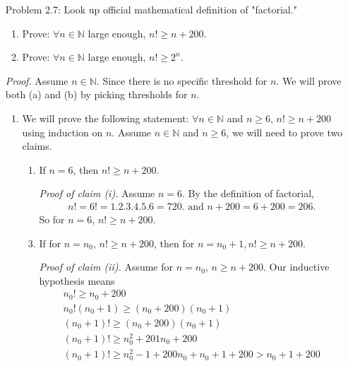 \documentclass{article}
\begin{document}
\begin{enumerate}
    \item[Problem 2.7:] Look up official mathematical definition of "factorial."
        \begin{enumerate}
            \item Prove: $\forall n \in \mathbb{N}$ large enough, $n! \ge n + 200$.
            \item Prove: $\forall n \in \mathbb{N}$ large enough, $n! \ge 2^n$.
        \end{enumerate}
    \item[] \emph{Proof.} Assume $n \in \mathbb{N}$. Since there is no specific threshold for $n$. We will prove both (a) and (b) by picking thresholds for $n$.
        \begin{enumerate}
            \item We will prove the following statement: $\forall n \in \mathbb{N}$ and $n \ge 6$, $n! \ge n + 200$ using induction on $n$. Assume $n \in \mathbb{N}$ and $n \ge 6$, we will need to prove two claims.
                \begin{enumerate}
                    \item If $n = 6$, then $n! \ge n + 200$.
                    \item[] \emph{Proof of claim (i).}  Assume $n = 6$. By the definition of factorial,
                        \begin{gather*}
                            n! = 6! = 1.2.3.4.5.6 = 720. \text{ and }
                            n + 200 = 6 + 200 = 206.
                        \end{gather*}
                        So for $n = 6$, $n! \ge n + 200$.
                    \item If for $n = n_0$, $n! \ge n + 200$, then for $n = n_0 + 1, n! \ge n + 200$.
                    \item[] \emph{Proof of claim (ii).} Assume for $n = n_0$, $n \ge n + 200$. Our inductive hypothesis means
                        \begin{gather*}
                            n_0! \ge n_0 + 200\\
                            n_0!(n_0 + 1) \ge (n_0 + 200)(n_0 + 1)\\
                            (n_0 + 1)! \ge (n_0 + 200)(n_0 + 1)\\
                            (n_0 + 1)! \ge n_0^2 + 201n_0 + 200\\
                            (n_0 + 1)! \ge n_0^2 - 1 + 200n_0 + n_0 + 1 + 200 > n_0 + 1 + 200\\

\end{gather*}
\end{enumerate}
\end{enumerate}
\end{enumerate}
\end{document}
